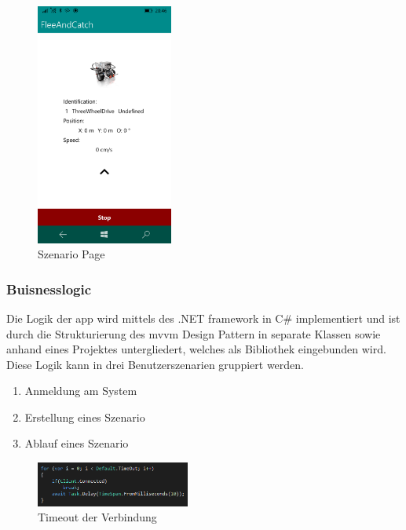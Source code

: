 \bigskip

\begin{figure}[h]
	\begin{center}
		\includegraphics[width=0.4\textwidth]{images/implementation/szenario.png}
	\end{center}	
	\caption{Szenario Page}
	\label{fig:szenario}
\end{figure}

\newpage
\subsubsection{Buisnesslogic} %

Die Logik der \gls{app} wird mittels des .NET \gls{framework} in C\# implementiert und ist durch die Strukturierung des \gls{mvvm} Design Pattern in separate Klassen sowie anhand eines Projektes untergliedert, welches als Bibliothek eingebunden wird. Diese Logik kann in drei Benutzerszenarien gruppiert werden.
\begin{enumerate}
	\item Anmeldung am System
	\item Erstellung eines Szenario
	\item Ablauf eines Szenario
\end{enumerate}

\begin{figure}
	\begin{center}
		\includegraphics[width=0.45\textwidth]{images/implementation/timeout_app.png}
	\end{center}
	\caption{Timeout der Verbindung}
	\label{fig:timeout_app}
\end{figure}

